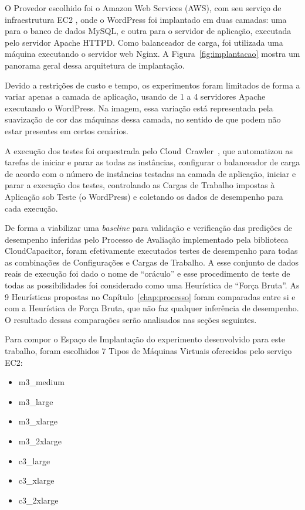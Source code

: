 O Provedor escolhido foi o Amazon Web Services (AWS), com seu serviço de infraestrutura EC2
\cite{ec2}, onde o WordPress foi implantado em duas camadas: uma para o banco de 
dados MySQL, e outra para o servidor de aplicação, executada pelo servidor Apache HTTPD. Como
balanceador de carga, foi utilizada uma máquina executando o servidor web Nginx. A
Figura~\ref{fig:implantacao} mostra um panorama geral dessa arquitetura de implantação. 

Devido a restrições de custo e tempo, os experimentos foram limitados de forma a variar 
apenas a camada de aplicação, usando de 1 a 4 servidores Apache executando o WordPress. 
Na imagem, essa variação está representada pela suavização de cor das máquinas dessa 
camada, no sentido de que podem não estar presentes em certos cenários.

A execução dos testes foi orquestrada pelo Cloud~Crawler~\cite{cunha2012ambiente},
que automatizou as tarefas de iniciar e parar as todas as instâncias, configurar 
o balanceador de carga de acordo com o número de instâncias testadas na camada de 
aplicação, iniciar e parar a execução dos testes, controlando as Cargas de Trabalho
impostas à Aplicação sob Teste (o WordPress) e coletando os dados de desempenho 
para cada execução. 

De forma a viabilizar uma \emph{baseline} para validação e verificação das 
predições de desempenho inferidas pelo Processo de Avaliação implementado pela 
biblioteca CloudCapacitor, foram efetivamente executados testes de desempenho 
para todas as combinações de Configurações e Cargas de Trabalho. A esse conjunto
de dados reais de execução foi dado o nome de ``oráculo'' e esse procedimento
de teste de todas as possibilidades foi considerado como uma Heurística de ``Força
Bruta''. As 9 Heurísticas propostas no Capítulo~\ref{chap:processo} foram comparadas
entre si e com a Heurística de Força Bruta, que não faz qualquer inferência de
desempenho. O resultado dessas comparações serão analisados nas seções seguintes.

Para compor o Espaço de Implantação do experimento desenvolvido para este trabalho, 
foram escolhidos 7 Tipos de Máquinas Virtuais oferecidos pelo serviço EC2:

\begin{itemize}
  \item m3\_medium 
  \item m3\_large
  \item m3\_xlarge
  \item m3\_2xlarge
  \item c3\_large
  \item c3\_xlarge
  \item c3\_2xlarge
\end{itemize}

